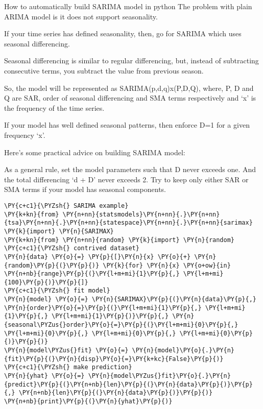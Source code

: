 How to automatically build SARIMA model in python The problem with plain
ARIMA model is it does not support seasonality.

If your time series has defined seasonality, then, go for SARIMA which
uses seasonal differencing.

Seasonal differencing is similar to regular differencing, but, instead
of subtracting consecutive terms, you subtract the value from previous
season.

So, the model will be represented as SARIMA(p,d,q)x(P,D,Q), where, P, D
and Q are SAR, order of seasonal differencing and SMA terms respectively
and `x' is the frequency of the time series.

If your model has well defined seasonal patterns, then enforce D=1 for a
given frequency `x'.

Here's some practical advice on building SARIMA model:

As a general rule, set the model parameters such that D never exceeds
one. And the total differencing `d + D' never exceeds 2. Try to keep
only either SAR or SMA terms if your model has seasonal components.

\begin{tcolorbox}[breakable, size=fbox, boxrule=1pt, pad at break*=1mm,colback=cellbackground, colframe=cellborder]
\begin{Verbatim}[commandchars=\\\{\}]
\PY{c+c1}{\PYZsh{} SARIMA example}
\PY{k+kn}{from} \PY{n+nn}{statsmodels}\PY{n+nn}{.}\PY{n+nn}{tsa}\PY{n+nn}{.}\PY{n+nn}{statespace}\PY{n+nn}{.}\PY{n+nn}{sarimax} \PY{k}{import} \PY{n}{SARIMAX}
\PY{k+kn}{from} \PY{n+nn}{random} \PY{k}{import} \PY{n}{random}
\PY{c+c1}{\PYZsh{} contrived dataset}
\PY{n}{data} \PY{o}{=} \PY{p}{[}\PY{n}{x} \PY{o}{+} \PY{n}{random}\PY{p}{(}\PY{p}{)} \PY{k}{for} \PY{n}{x} \PY{o+ow}{in} \PY{n+nb}{range}\PY{p}{(}\PY{l+m+mi}{1}\PY{p}{,} \PY{l+m+mi}{100}\PY{p}{)}\PY{p}{]}
\PY{c+c1}{\PYZsh{} fit model}
\PY{n}{model} \PY{o}{=} \PY{n}{SARIMAX}\PY{p}{(}\PY{n}{data}\PY{p}{,} \PY{n}{order}\PY{o}{=}\PY{p}{(}\PY{l+m+mi}{1}\PY{p}{,} \PY{l+m+mi}{1}\PY{p}{,} \PY{l+m+mi}{1}\PY{p}{)}\PY{p}{,} \PY{n}{seasonal\PYZus{}order}\PY{o}{=}\PY{p}{(}\PY{l+m+mi}{0}\PY{p}{,} \PY{l+m+mi}{0}\PY{p}{,} \PY{l+m+mi}{0}\PY{p}{,} \PY{l+m+mi}{0}\PY{p}{)}\PY{p}{)}
\PY{n}{model\PYZus{}fit} \PY{o}{=} \PY{n}{model}\PY{o}{.}\PY{n}{fit}\PY{p}{(}\PY{n}{disp}\PY{o}{=}\PY{k+kc}{False}\PY{p}{)}
\PY{c+c1}{\PYZsh{} make prediction}
\PY{n}{yhat} \PY{o}{=} \PY{n}{model\PYZus{}fit}\PY{o}{.}\PY{n}{predict}\PY{p}{(}\PY{n+nb}{len}\PY{p}{(}\PY{n}{data}\PY{p}{)}\PY{p}{,} \PY{n+nb}{len}\PY{p}{(}\PY{n}{data}\PY{p}{)}\PY{p}{)}
\PY{n+nb}{print}\PY{p}{(}\PY{n}{yhat}\PY{p}{)}
\end{Verbatim}
\end{tcolorbox}

